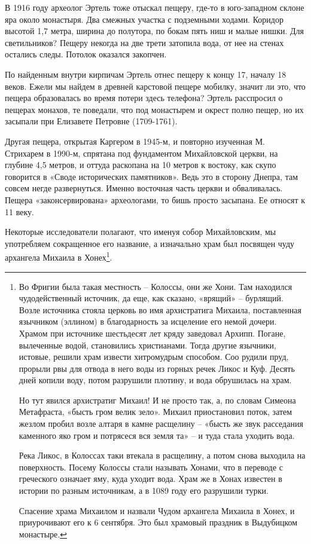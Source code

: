 В 1916 году археолог Эртель тоже отыскал пещеру, где-то в юго-западном склоне яра около монастыря. Два смежных участка с подземными ходами. Коридор высотой 1,7 метра, ширина до полутора, по бокам пять ниш и малые нишки. Для светильников? Пещеру некогда на две трети затопила вода, от нее на стенах остались следы. Потолок оказался закопчен.

По найденным внутри кирпичам Эртель отнес пещеру к концу 17, началу 18 веков. Ежели мы найдем в древней карстовой пещере мобилку, значит ли это, что пещера образовалась во время потери здесь телефона? Эртель расспросил о пещерах монахов, те поведали, что под монастырем и окрест полно пещер, но их засыпали при Елизавете Петровне (1709-1761).

Другая пещера, открытая Каргером в 1945-м, и повторно изученная М. Стрихарем в 1990-м, спрятана под фундаментом Михайловской церкви, на глубине 4,5 метров, и оттуда раскопана на 10 метров к востоку, как скупо говорится в «Своде исторических памятников». Ведь это в сторону Днепра, там совсем негде развернуться. Именно восточная часть церкви и обваливалась. Пещера «законсервирована» археологами, то бишь просто засыпана. Ее относят к 11 веку.

Некоторые исследователи полагают, что именуя собор Михайловским, мы употребляем сокращенное его название, а изначально храм был посвящен чуду архангела Михаила в Хонех\footnote{Во Фригии была такая местность – Колоссы, они же Хони. Там находился чудодейственный источник, да еще, как сказано, «врящий» – бурлящий. Возле источника стояла церковь во имя архистратига Михаила, поставленная язычником (эллином) в благодарность за исцеление его немой дочери. Храмом при источнике шестьдесят лет кряду заведовал Архипп. Погане, вылеченные водой, становились христианами. Тогда другие язычники, истовые, решили храм извести хитромудрым способом. Соо рудили пруд, прорыли рвы для отвода в него воды из горных речек Ликос и Куф. Десять дней копили воду, потом разрушили плотину, и вода обрушилась на храм.

Но тут явился архистратиг Михаил! И не просто так, а, по словам Симеона Метафраста, «бысть гром велик зело». Михаил приостановил поток, затем жезлом пробил возле алтаря в камне расщелину – «бысть же звук расседания каменного яко гром и потрясеся вся земля та» – и туда стала уходить вода.

Река Ликос, в Колоссах таки втекала в расщелину, а потом снова выходила на поверхность. Посему Колоссы стали называть Хонами, что в переводе с греческого означает яму, куда уходит вода. Храм же в Хонах известен в истории по разным источникам, а в 1089 году его разрушили турки.

Спасение храма Михаилом и назвали Чудом архангела Михаила в Хонех, и приурочивают его к 6 сентября. Это был храмовый праздник в Выдубицком монастыре.}. 

